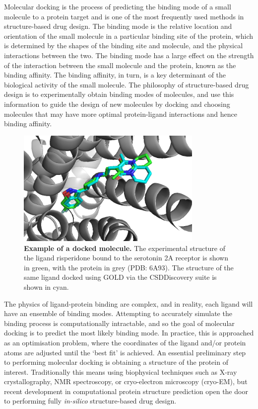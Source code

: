 Molecular docking is the process of predicting the binding mode of a small molecule to a protein target and is one of the most frequently used methods in structure-based drug design. \cite{meng2011molecular, Kitchen2004Docking} The binding mode is the relative location and orientation of the small molecule in a particular binding site of the protein, which is determined by the shapes of the binding site and molecule, and the physical interactions between the two. The binding mode has a large effect on the strength of the interaction between the small molecule and the protein, known as the binding affinity. The binding affinity, in turn, is a key determinant of the biological activity of the small molecule. The philosophy of structure-based drug design is to experimentally obtain binding modes of molecules, and use this information to guide the design of new molecules by docking and choosing molecules that may have more optimal protein-ligand interactions and hence binding affinity.

\begin{figure}[!h]
 \centering
 \includegraphics[width=0.8\textwidth]{Chapters/Background/Figs/docked_6a93.png}
 \caption{\label{fig:docked} \textbf{Example of a docked molecule.} The experimental structure of the ligand risperidone bound to the serotonin 2A receptor is shown in green, with the protein in grey (PDB: 6A93). The structure of the same ligand docked using GOLD via the CSDDiscovery suite is shown in cyan.}
\end{figure}

The physics of ligand-protein binding are complex, and in reality, each ligand will have an ensemble of binding modes. Attempting to accurately simulate the binding process is computationally intractable, and so the goal of molecular docking is to predict the most likely binding mode. In practice, this is approached as an optimisation problem, where the coordinates of the ligand and/or protein atoms are adjusted until the `best fit' is achieved. An essential preliminary step to performing molecular docking is obtaining a structure of the protein of interest. Traditionally this means using biophysical techniques such as X-ray crystallography, NMR spectroscopy, or cryo-electron microscopy (cryo-EM), but recent development in computational protein structure prediction \cite{Jumper2021AlphaFold, Wong2022AF2Docking} open the door to performing fully \textit{in-silico} structure-based drug design.

